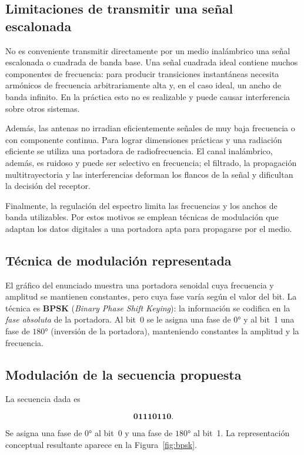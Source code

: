 \documentclass[12pt,a4paper]{article}
\begin{document}
\subsection{Limitaciones de transmitir una señal escalonada}

No es conveniente transmitir directamente por un medio inalámbrico una señal
escalonada o cuadrada de banda base. Una señal cuadrada ideal contiene muchos
componentes de frecuencia: para producir transiciones instantáneas necesita
armónicos de frecuencia arbitrariamente alta y, en el caso ideal, un ancho de
banda infinito. En la práctica esto no es realizable y puede causar
interferencia sobre otros sistemas.

Además, las antenas no irradian eficientemente señales de muy baja frecuencia o
con componente continua. Para lograr dimensiones prácticas y una radiación
eficiente se utiliza una portadora de radiofrecuencia. El canal inalámbrico,
además, es ruidoso y puede ser selectivo en frecuencia; el filtrado, la
propagación multitrayectoria y las interferencias deforman los flancos de la
señal y dificultan la decisión del receptor.

Finalmente, la regulación del espectro limita las frecuencias y los anchos de
banda utilizables. Por estos motivos se emplean técnicas de modulación que
adaptan los datos digitales a una portadora apta para propagarse por el medio.

\subsection{Técnica de modulación representada}

El gráfico del enunciado muestra una portadora senoidal cuya frecuencia y
amplitud se mantienen constantes, pero cuya fase varía según el valor del bit.
La técnica es \textbf{BPSK} (\emph{Binary Phase Shift Keying}): la información
se codifica en la \emph{fase absoluta} de la portadora. Al bit~0 se le asigna
una fase de $0°$ y al bit~1 una fase de $180°$ (inversión de la portadora),
manteniendo constantes la amplitud y la frecuencia.

\subsection{Modulación de la secuencia propuesta}

La secuencia dada es

\[
\mathbf{01110110}.
\]

Se asigna una fase de $0°$ al bit~0 y una fase de $180°$ al bit~1. La
representación conceptual resultante aparece en la Figura~\ref{fig:bpsk}.
\end{document}

